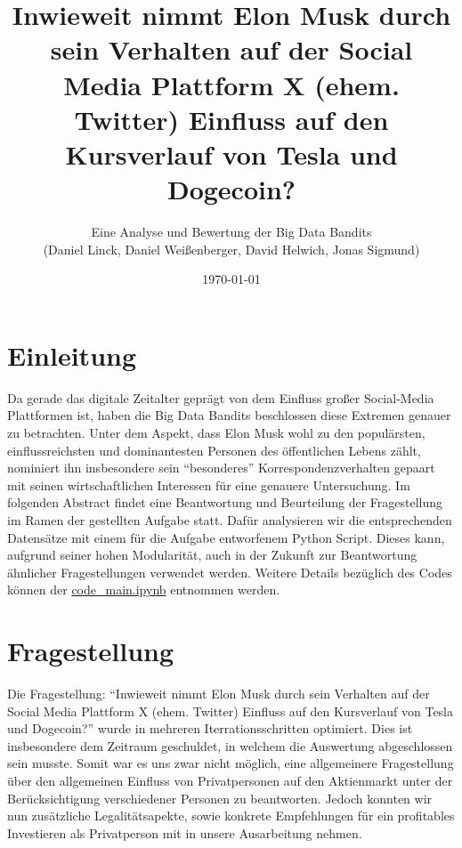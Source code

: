 \documentclass{article}
\title{\textbf {Inwieweit nimmt Elon Musk durch sein Verhalten auf der Social Media Plattform X (ehem. Twitter) Einfluss auf den Kursverlauf von Tesla und Dogecoin?}}
\author{Eine Analyse und Bewertung der Big Data Bandits \\ (Daniel Linck, Daniel Weißenberger, David Helwich, Jonas Sigmund)}
\date{\today}
\begin{document}
\maketitle

\tableofcontents
\newpage

\section{Einleitung}
Da gerade das digitale Zeitalter geprägt von dem Einfluss großer Social-Media Plattformen ist, haben die Big Data Bandits beschlossen diese Extremen genauer zu betrachten.
Unter dem Aspekt, dass Elon Musk wohl zu den populärsten, einflussreichsten und dominantesten Personen des öffentlichen Lebens zählt, nominiert ihn insbesondere sein ``besonderes'' Korrespondenzverhalten gepaart mit seinen wirtschaftlichen Interessen für eine genauere Untersuchung.
Im folgenden Abstract findet eine Beantwortung und Beurteilung der Fragestellung im Ramen der gestellten Aufgabe statt.
Dafür analysieren wir die entsprechenden Datensätze mit einem für die Aufgabe entworfenem Python Script.
Dieses kann, aufgrund seiner hohen Modularität, auch in der Zukunft zur Beantwortung ähnlicher Fragestellungen verwendet werden.
Weitere Details bezüglich des Codes können der \href{https://github.com/alphaname007/BigDataBandits/blob/17e158a26d8d1cc538102ff44e4171b609965e95/code\_main.ipynb}{code\_main.ipynb} entnommen werden.



\section{Fragestellung}
Die Fragestellung: ``Inwieweit nimmt Elon Musk durch sein Verhalten auf der Social Media Plattform X (ehem. Twitter) Einfluss auf den Kursverlauf von Tesla und Dogecoin?'' wurde in mehreren Iterrationsschritten optimiert. 
Dies ist insbesondere dem Zeitraum geschuldet, in welchem die Auswertung abgeschlossen sein musste.
Somit war es uns zwar nicht möglich, eine allgemeinere Fragestellung über den allgemeinen Einfluss von Privatpersonen auf den Aktienmarkt unter der Berücksichtigung verschiedener Personen zu beantworten.
Jedoch konnten wir nun zusätzliche Legalitätsapekte, sowie konkrete Empfehlungen für ein profitables Investieren als Privatperson mit in unsere Ausarbeitung nehmen.
\end{document}
